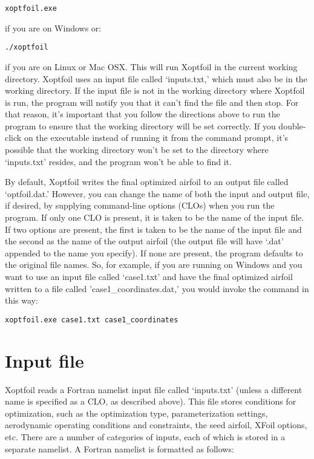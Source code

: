 \documentclass[11pt]{article}
\begin{document}
\begin{verbatim}
xoptfoil.exe
\end{verbatim}

\noindent if you are on Windows or:

\begin{verbatim}
./xoptfoil
\end{verbatim}

\noindent if you are on Linux or Mac OSX.  This will run Xoptfoil in the current working
directory.  Xoptfoil uses an input file called `inputs.txt,' which must also be in the
working directory.  If the input file is not in the working directory where Xoptfoil is
run, the program will notify you that it can't find the file and then stop.  For that
reason, it's important that you follow the directions above to run the program to ensure
that the working directory will be set correctly.  If you double-click on the executable
instead of running it from the command prompt, it's possible that the working directory
won't be set to the directory where `inputs.txt' resides, and the program won't be able to
find it.

By default, Xoptfoil writes the final optimized airfoil to an output file called
`optfoil.dat.'  However, you can change the name of both the input and output file, if
desired, by supplying command-line options (CLOs) when you run the program.  If only one 
CLO is present, it is
taken to be the name of the input file.  If two options are present, the first is taken to
be the name of the input file and the second as
the name of the output airfoil (the output file will have `.dat' appended to the name you
specify). If none are present, the program defaults to the
original file names.  So, for example, if you are running on Windows and you want to
use an input file called `case1.txt' and have the final optimized airfoil written to a
file called 'case1\_coordinates.dat,' you would invoke the command in this way:

\begin{verbatim}
xoptfoil.exe case1.txt case1_coordinates
\end{verbatim}

\section{Input file}

Xoptfoil reads a Fortran namelist input file called `inputs.txt' (unless a different name
is specified as a CLO, as described above).  This file stores
conditions for optimization, such as the optimization type, parameterization settings,
aerodynamic operating conditions and constraints, the seed airfoil, XFoil options, etc.
There are a number of categories of inputs, each of which is stored in a separate
namelist.  A Fortran namelist is formatted as follows:
\end{document}
